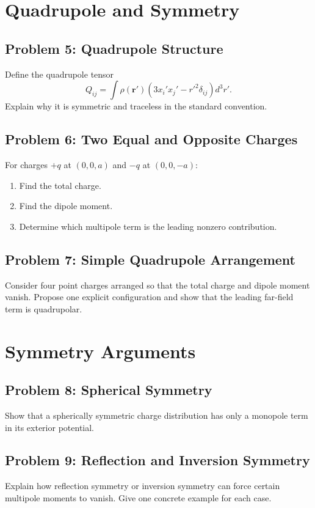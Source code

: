 \documentclass[hidelinks]{article}
\begin{document}
\section{Quadrupole and Symmetry}
\subsection{Problem 5: Quadrupole Structure}
Define the quadrupole tensor
\[
Q_{ij}=\int \rho(\mathbf{r}')\left(3x_i'x_j'-r'^2\delta_{ij}\right)d^3r'.
\]
Explain why it is symmetric and traceless in the standard convention.

\subsection{Problem 6: Two Equal and Opposite Charges}
For charges $+q$ at $(0,0,a)$ and $-q$ at $(0,0,-a)$:
\begin{enumerate}[label=\alph*)]
\item Find the total charge.
\item Find the dipole moment.
\item Determine which multipole term is the leading nonzero contribution.
\end{enumerate}

\subsection{Problem 7: Simple Quadrupole Arrangement}
Consider four point charges arranged so that the total charge and dipole moment vanish. Propose one explicit configuration and show that the leading far-field term is quadrupolar.

\section{Symmetry Arguments}
\subsection{Problem 8: Spherical Symmetry}
Show that a spherically symmetric charge distribution has only a monopole term in its exterior potential.

\subsection{Problem 9: Reflection and Inversion Symmetry}
Explain how reflection symmetry or inversion symmetry can force certain multipole moments to vanish. Give one concrete example for each case.
\end{document}
